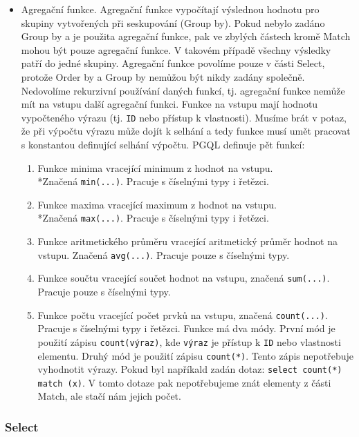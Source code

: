 \begin{itemize}
\item 
Agregační funkce.
Agregační funkce vypočítají výslednou hodnotu pro skupiny vytvořených při seskupování (Group by).
Pokud nebylo zadáno Group by a je použita agregační funkce, pak ve zbylých částech kromě Match mohou být pouze agregační funkce.
V takovém případě všechny výsledky patří do jedné skupiny.
Agregační funkce povolíme pouze v části Select, protože Order by a Group by nemůžou být nikdy zadány společně.
Nedovolíme rekurzivní používání daných funkcí, tj. agregační funkce nemůže mít na vstupu další agregační funkci.
Funkce na vstupu mají hodnotu vypočteného výrazu (tj. \texttt{ID} nebo přístup k vlastnosti).
Musíme brát v potaz, že při výpočtu výrazu může dojít k selhání a tedy funkce musí umět pracovat s konstantou definující selhání výpočtu.
PGQL definuje pět funkcí:
\begin{enumerate}
\item Funkce minima vracející minimum z hodnot na vstupu. 
\\*Značená \texttt{min(...)}.
Pracuje s číselnými typy i řetězci.
\item Funkce maxima vracející maximum z hodnot na vstupu. 
\\*Značená \texttt{max(...)}.
Pracuje s číselnými typy i řetězci.
\item Funkce aritmetického průměru vracející aritmetický průměr hodnot na vstupu.
Značená \texttt{avg(...)}.
Pracuje pouze s číselnými typy.
\item Funkce součtu vracející součet hodnot na vstupu, značená \texttt{sum(...)}.
Pracuje pouze s číselnými typy.
\item Funkce počtu vracející počet prvků na vstupu, značená \texttt{count(...)}.
Pracuje s číselnými typy i řetězci.
Funkce má dva módy.
První mód je použití zápisu \texttt{count(výraz)}, kde \texttt{výraz} je přístup k \texttt{ID} nebo vlastnosti elementu.
Druhý mód je použití zápisu \texttt{count(*)}.
Tento zápis nepotřebuje vyhodnotit výrazy.
Pokud byl napříkald zadán dotaz:
\texttt{select count(*) match (x)}.
V tomto dotaze pak nepotřebujeme znát elementy z části Match, ale stačí nám jejich počet.
\end{enumerate}
\end{itemize}

\subsubsection{Select}

